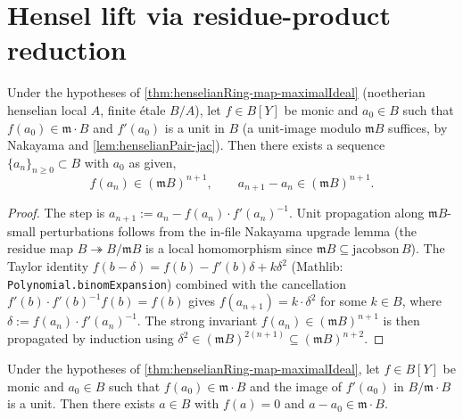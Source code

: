 \section{Hensel lift via residue-product reduction}

\begin{lemma}
\label{lem:henselianPair-newton-step}
\leanok
Under the hypotheses of \cref{thm:henselianRing-map-maximalIdeal}
(noetherian henselian local $A$, finite étale $B/A$), let
$f \in B[Y]$ be monic and $a_0 \in B$ such that $f(a_0) \in
\mathfrak m \cdot B$ and $f'(a_0)$ is a unit in $B$ (a unit-image
modulo $\mathfrak m B$ suffices, by Nakayama and
\cref{lem:henselianPair-jac}). Then there exists a sequence
$\{a_n\}_{n \ge 0} \subset B$ with $a_0$ as given,
\[
  f(a_n) \in (\mathfrak m B)^{n+1},
  \qquad
  a_{n+1} - a_n \in (\mathfrak m B)^{n+1}.
\]
\end{lemma}

\begin{proof}

\leanok
The step is $a_{n+1} := a_n - f(a_n) \cdot f'(a_n)^{-1}$. Unit
propagation along $\mathfrak m B$-small perturbations follows
from the in-file Nakayama upgrade lemma (the residue map
$B \twoheadrightarrow B/\mathfrak m B$ is a local homomorphism
since $\mathfrak m B \subseteq \mathrm{jacobson}\,B$). The Taylor
identity
\(f(b - \delta) = f(b) - f'(b)\delta + k \delta^2\)
(Mathlib: \texttt{Polynomial.binomExpansion}) combined with the
cancellation \(f'(b) \cdot f'(b)^{-1} f(b) = f(b)\) gives
$f(a_{n+1}) = k \cdot \delta^2$ for some $k \in B$, where
$\delta := f(a_n) \cdot f'(a_n)^{-1}$. The strong invariant
$f(a_n) \in (\mathfrak m B)^{n+1}$ is then propagated by induction
using $\delta^2 \in (\mathfrak m B)^{2(n+1)} \subseteq
(\mathfrak m B)^{n+2}$.
\end{proof}

\begin{lemma}
\label{lem:henselianPair-is-henselian}
Under the hypotheses of \cref{thm:henselianRing-map-maximalIdeal},
let $f \in B[Y]$ be monic and $a_0 \in B$ such that
$f(a_0) \in \mathfrak m \cdot B$ and the image of $f'(a_0)$ in
$B / \mathfrak m \cdot B$ is a unit. Then there exists $a \in B$
with $f(a) = 0$ and $a - a_0 \in \mathfrak m \cdot B$.
\end{lemma}

